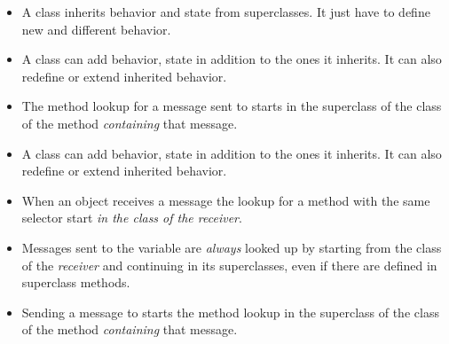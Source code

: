 \begin{itemize}
\item A class inherits behavior and state from superclasses. It just have to define new and different behavior.

\item A class can add behavior, state in addition to the ones it inherits. It can also redefine or extend inherited behavior.
\item The method lookup  for a  message sent to  starts in the superclass of the class of the method \emph{containing} that message.

\item A class can add behavior, state in addition to the ones it inherits. It can also redefine or extend inherited behavior.

\item When an object receives a message the lookup for a method with the same selector start \emph{in the  class of the receiver}.

\item Messages sent to the variable  are \emph{always} looked up by starting from the class of the \emph{receiver} and continuing in its superclasses, even if there are defined in superclass methods.

\item Sending a message to  starts the method lookup in the superclass of the class of the method \emph{containing} that message.
\end{itemize}

\ifx\wholebook\relax\else
\fi
